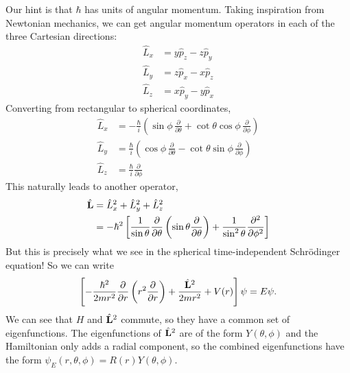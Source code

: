 \documentclass[../p052main.tex]{subfiles}
\begin{document}
Our hint is that $\hbar$ has units of angular momentum.
Taking inspiration from Newtonian mechanics, we can get angular momentum operators in each of the three Cartesian directions:
\begin{align*}
    \hat L_x &= y \hat p_z - z \hat p_y \\
    \hat L_y &= z \hat p_x - x \hat p_z \\
    \hat L_z &= x \hat p_y - y \hat p_x
\end{align*}
Converting from rectangular to spherical coordinates,
\begin{align*}
    \hat L_x &= -\frac{\hbar}{i} \left( \sin \phi \,\frac{\partial}{\partial \theta} + \cot \theta \cos \phi \,\frac{\partial}{\partial \phi} \right) \\
    \hat L_y &= \frac{\hbar}{i} \left( \cos \phi \,\frac{\partial}{\partial \theta} - \cot \theta \sin \phi \,\frac{\partial}{\partial \phi} \right) \\
    \hat L_z &= \frac{\hbar}{i} \frac{\partial}{\partial \phi}
\end{align*}
This naturally leads to another operator,
\begin{align*}
    \hat{\mathbf{L}} &= \hat L_x^2 + \hat L_y^2 + \hat L_z^2 \\
    &= -\hbar^2 \left[ \frac{1}{\sin \theta} \frac{\partial}{\partial \theta} \left( \sin \theta \frac{\partial}{\partial \theta} \right) + \frac{1}{\sin^2 \theta} \frac{\partial^2}{\partial \phi^2} \right]
\end{align*}
But this is precisely what we see in the spherical time-independent Schrödinger equation!
So we can write
\[ \left[ -\frac{\hbar^2}{2mr^2} \frac{\partial}{\partial r} \left( r^2 \frac{\partial}{\partial r} \right) + \frac{\hat{\mathbf{L}}^2}{2mr^2} + V(r) \right] \psi = E\psi. \]
We can see that $H$ and $\hat{\mathbf{L}}^2$ commute, so they have a common set of eigenfunctions.
The eigenfunctions of $\hat{\mathbf{L}}^2$ are of the form $Y(\theta, \phi)$ and the Hamiltonian only adds a radial component, so the combined eigenfunctions have the form $\psi_E (r,\theta,\phi) = R(r) Y(\theta, \phi)$.
\end{document}
